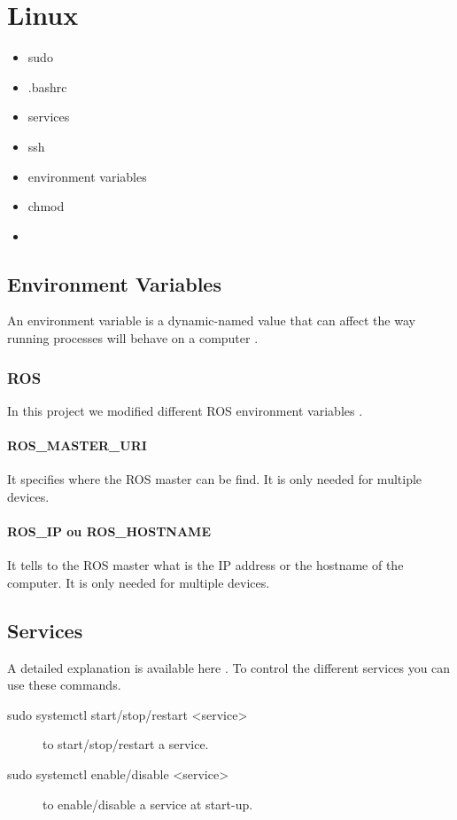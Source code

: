 \chapter{Linux}
\begin{itemize}
    \item sudo
    \item .bashrc
    \item services
    \item ssh
    \item environment variables
    \item chmod
    \item
\end{itemize}

\section{Environment Variables}
An environment variable is a dynamic-named value that can affect the way running processes will behave on a computer \cite{wikipedia_env_var}.
\subsection{ROS}
In this project we modified different ROS environment variables \cite{ros_env_var}.
\subsubsection{ROS\_MASTER\_URI}
It specifies where the ROS master can be find.
It is only needed for multiple devices.

\subsubsection{ROS\_IP ou ROS\_HOSTNAME}
It tells to the ROS master what is the IP address or the hostname of the computer.
It is only needed for multiple devices.

\section{Services} \label{services}
A detailed explanation is available here \cite{techrepublic_services}.
To control the different services you can use these commands.
\begin{description}
    \item[sudo systemctl start/stop/restart <service>] to start/stop/restart a service.
    \item[sudo systemctl enable/disable <service>] to enable/disable a service at start-up.
\end{description}
